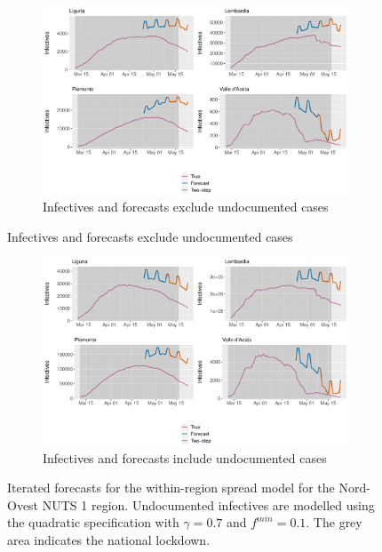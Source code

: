 \documentclass[12pt]{article}
\begin{document}
	\begin{figure}[H]
	    \centering
	    \begin{subfigure}{\textwidth}
	      \centering
	      \includegraphics[width=0.92\linewidth]{output/model_within_lag14_forecast_full_Nord-Ovest.pdf}
	      \caption{Infectives and forecasts exclude undocumented cases}
	      \label{fig:forecast_full_within_nordovest_regular}
	    \end{subfigure}
    \end{figure}
    \begin{figure}[H]\ContinuedFloat
	    \begin{subfigure}{\textwidth}
	      \centering
	      \includegraphics[width=0.92\linewidth]{output/model_within_lag14_forecast_full_Nord-Ovest_UndocQuadratic.pdf}
	      \caption{Infectives and forecasts include undocumented cases}
	      \label{fig:forecast_full_within_nordovest_undoc}
	    \end{subfigure}
	    \caption{Iterated forecasts for the within-region spread model for the Nord-Ovest NUTS 1 region. Undocumented infectives are modelled using the quadratic specification with $\gamma = 0.7$ and $f^{min}=0.1$. The grey area indicates the national lockdown.}
	    \label{fig:forecast_full_within_nordovest}
    \end{figure}
    
\end{document}
